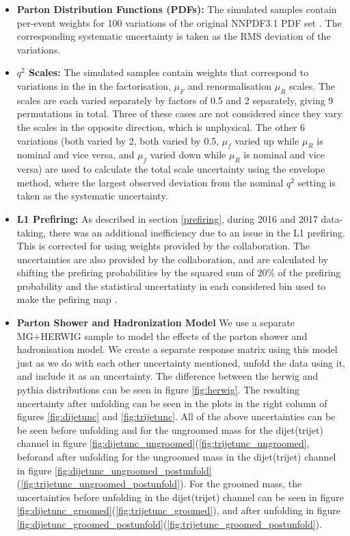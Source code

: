\begin{itemize}
\item \textbf{Parton Distribution Functions (PDFs):}
  The simulated samples contain per-event weights for 100 variations of the original NNPDF3.1 PDF set \cite{nnpdf3.1}. The corresponding systematic uncertainty is taken as the RMS deviation of the variations.
\item \textbf{$q^2$ Scales:}
  The simulated samples contain weights that correspond to variations in the in the factorisation, $\mu_F$ and renormalisation $\mu_R$ scales. The scales are each varied separately by factors of 0.5 and 2 separately, giving 9 permutations in total. Three of these cases are not considered since they vary the scales in the opposite direction, which is unphysical. The other 6 variations (both varied by 2, both varied by 0.5, $\mu_f$ varied up while $\mu_R$ is nominal and vice versa, and  $\mu_f$ varied down while $\mu_R$ is nominal and vice versa) are used to calculate the total scale uncertainty using the envelope method, where the largest observed deviation from the nominal $q^2$ setting is taken as the systematic uncertainty.
\item \textbf{L1 Prefiring:}
  As described in section \ref{prefiring}, during 2016 and 2017 data-taking, there was an additional inefficiency due to an issue in the L1 prefiring. This is corrected for using weights provided by the collaboration. The uncertainties are also provided by the collaboration, and are calculated by shifting the prefiring probabilities by the squared sum of $20\%$ of the prefiring probability and the statistical uncertatinty in each considered bin used to make the pefiring map \cite{l1prefiring}.
\item \textbf{Parton Shower and Hadronization Model}
  We use a separate MG+HERWIG sample to model the effects of the parton shower and hadronisation model. We create a separate response matrix using this model just as we do with each other uncertainty mentioned, unfold the data using it, and include it as an uncertainty. The difference between the herwig and pythia distributions can be seen in figure \ref{fig:herwig}. The resulting uncertainty after unfolding can be seen in the plots in the right column of figures \ref{fig:dijetunc} and \ref{fig:trijetunc}.
  All of the above uncertainties can be be seen before unfolding and for the ungroomed mass for the dijet(trijet) channel in figure \ref{fig:dijetunc_ungroomed}(\ref{fig:trijetunc_ungroomed}, beforand after unfolding for the ungroomed mass in the dijet(trijet) channel in figure \ref{fig:dijetunc_ungroomed_postunfold}(\ref{fig:trijetunc_ungroomed_postunfold}). For the groomed mass, the uncertainties before unfolding in the dijet(trijet) channel can be seen in figure \ref{fig:dijetunc_groomed}(\ref{fig:trijetunc_groomed}), and after unfolding in figure \ref{fig:dijetunc_groomed_postunfold}(\ref{fig:trijetunc_groomed_postunfold}).
\end{itemize}
